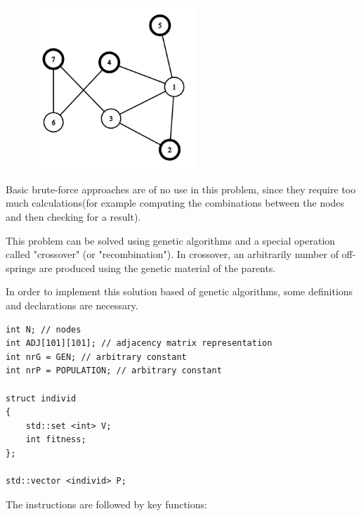 \documentclass[letterpaper]{article}
\begin{document}
\newpage

\begin{figure} [h!]
\centering
\includegraphics[width=0.55\textwidth]{pngOfDiagrams/graphmaximumindependentset.png}
\end{figure}

Basic brute-force approaches are of no use in this problem, since they require too much calculations(for example computing the combinations between the nodes and then checking for a result). 

This problem can be solved using genetic algorithms and a special operation called "crossover" (or "recombination"). In crossover, an arbitrarily number of off-springs are produced using the genetic material of the parents.


In order to implement this solution based of genetic algorithms, some definitions and declarations are necessary.

\begin{lstlisting}
int N; // nodes
int ADJ[101][101]; // adjacency matrix representation
int nrG = GEN; // arbitrary constant 
int nrP = POPULATION; // arbitrary constant

struct individ
{
    std::set <int> V;
    int fitness;
};

std::vector <individ> P;
\end{lstlisting}

The instructions are followed by key functions:
\end{document}

